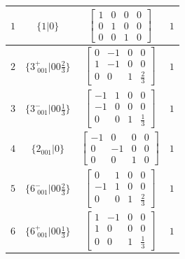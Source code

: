\documentclass[fleqn,8pt]{jsarticle}
\begin{document}
\begin{longtable}{cccc}
$ 1 $ & $ \{1|0\} $ & $ \begin{bmatrix} 1 & 0 & 0 & 0 \\ 0 & 1 & 0 & 0 \\ 0 & 0 & 1 & 0 \end{bmatrix} $ & $ 1 $ \\ \hline
$ 2 $ & $ \{3^{+}_{\,\,001}|0 0 \frac{2}{3}\} $ & $ \begin{bmatrix} 0 & -1 & 0 & 0 \\ 1 & -1 & 0 & 0 \\ 0 & 0 & 1 & \frac{2}{3} \end{bmatrix} $ & $ 1 $ \\ \hline
$ 3 $ & $ \{3^{-}_{\,\,001}|0 0 \frac{1}{3}\} $ & $ \begin{bmatrix} -1 & 1 & 0 & 0 \\ -1 & 0 & 0 & 0 \\ 0 & 0 & 1 & \frac{1}{3} \end{bmatrix} $ & $ 1 $ \\ \hline
$ 4 $ & $ \{2{}_{001}|0\} $ & $ \begin{bmatrix} -1 & 0 & 0 & 0 \\ 0 & -1 & 0 & 0 \\ 0 & 0 & 1 & 0 \end{bmatrix} $ & $ 1 $ \\ \hline
$ 5 $ & $ \{6^{-}_{\,\,001}|0 0 \frac{2}{3}\} $ & $ \begin{bmatrix} 0 & 1 & 0 & 0 \\ -1 & 1 & 0 & 0 \\ 0 & 0 & 1 & \frac{2}{3} \end{bmatrix} $ & $ 1 $ \\ \hline
$ 6 $ & $ \{6^{+}_{\,\,001}|0 0 \frac{1}{3}\} $ & $ \begin{bmatrix} 1 & -1 & 0 & 0 \\ 1 & 0 & 0 & 0 \\ 0 & 0 & 1 & \frac{1}{3} \end{bmatrix} $ & $ 1 $ \\
\end{longtable}
\end{document}
